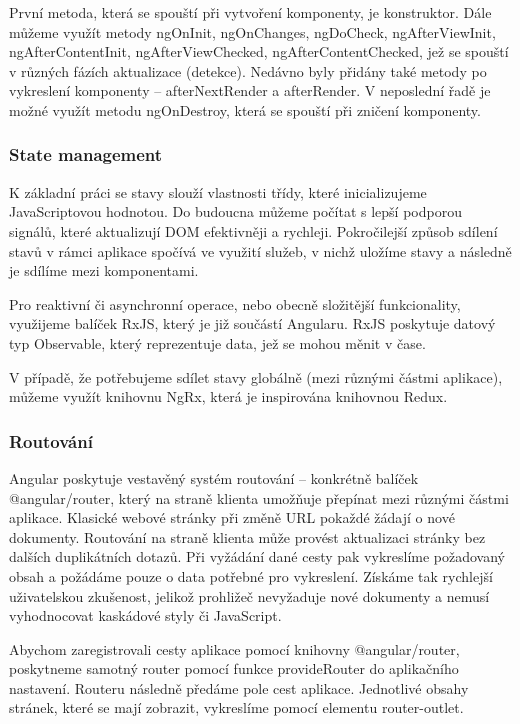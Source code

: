 První metoda, která se spouští při vytvoření komponenty, je konstruktor. 
Dále můžeme využít metody ngOnInit, ngOnChanges, ngDoCheck, ngAfterViewInit, ngAfterContentInit, ngAfterViewChecked, ngAfterContentChecked, jež se spouští v různých fázích aktualizace (detekce). 
Nedávno byly přidány také metody po vykreslení komponenty -- afterNextRender a afterRender. V neposlední řadě je možné využít metodu ngOnDestroy, která se spouští při zničení komponenty.\cite{angulardev,learningangular} 

\subsubsection{State management}

K základní práci se stavy slouží vlastnosti třídy, které inicializujeme JavaScriptovou hodnotou. 
Do budoucna můžeme počítat s lepší podporou signálů, které aktualizují DOM efektivněji a rychleji. 
Pokročilejší způsob sdílení stavů v rámci aplikace spočívá ve využití služeb, v nichž uložíme stavy a následně je sdílíme mezi komponentami.\cite{angulardev}

Pro reaktivní či asynchronní operace, nebo obecně složitější funkcionality, využijeme balíček RxJS, který je již součástí Angularu. 
RxJS poskytuje datový typ Observable, který reprezentuje data, jež se mohou měnit v čase.\cite{angulario,rxjslibrary}

V případě, že potřebujeme sdílet stavy globálně (mezi různými částmi aplikace), můžeme využít knihovnu NgRx, která je inspirována knihovnou Redux.\cite{angularstatemanagement,ngrxlib}

\subsubsection{Routování}

Angular poskytuje vestavěný systém routování -- konkrétně balíček @angular/router, který na straně klienta umožňuje přepínat mezi různými částmi aplikace. 
Klasické webové stránky při změně URL pokaždé žádají o nové dokumenty. Routování na straně klienta může provést aktualizaci stránky bez dalších duplikátních dotazů. 
Při vyžádání dané cesty pak vykreslíme požadovaný obsah a požádáme pouze o data potřebné pro vykreslení. 
Získáme tak rychlejší uživatelskou zkušenost, jelikož prohližeč nevyžaduje nové dokumenty a nemusí vyhodnocovat kaskádové styly či JavaScript.

Abychom zaregistrovali cesty aplikace pomocí knihovny @angular/router, poskytneme samotný router pomocí funkce provideRouter do aplikačního nastavení. 
Routeru následně předáme pole cest aplikace. Jednotlivé obsahy stránek, které se mají zobrazit, vykreslíme pomocí elementu router-outlet.\cite{angulardev,learningangular}

